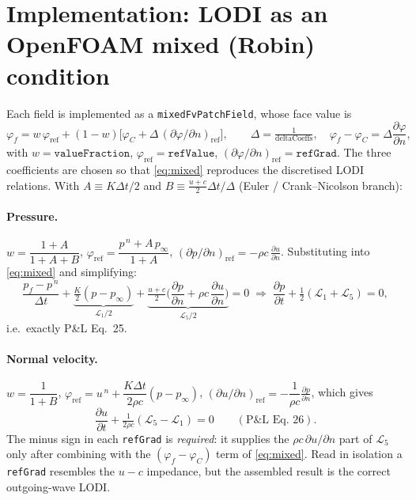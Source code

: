 \documentclass[11pt,a4paper]{article}
\newcommand{\dt}[1]{\frac{\partial #1}{\partial t}}
\newcommand{\dn}[1]{\frac{\partial #1}{\partial n}}
\newcommand{\Lc}{\mathcal{L}}
\newcommand{\code}[1]{\texttt{#1}}
\begin{document}
\section{Implementation: LODI as an OpenFOAM mixed (Robin) condition}
Each field is implemented as a \code{mixedFvPatchField}, whose face value is
\begin{equation}
  \varphi_f = w\,\varphi_{\mathrm{ref}}
              + (1-w)\big[\varphi_C + \Delta\,(\partial\varphi/\partial n)_{\mathrm{ref}}\big],
  \qquad \Delta=\tfrac{1}{\text{deltaCoeffs}},\quad
  \varphi_f-\varphi_C=\Delta\dn{\varphi},
  \label{eq:mixed}
\end{equation}
with $w=\code{valueFraction}$, $\varphi_{\mathrm{ref}}=\code{refValue}$,
$(\partial\varphi/\partial n)_{\mathrm{ref}}=\code{refGrad}$. The three
coefficients are chosen so that \eqref{eq:mixed} reproduces the discretised
LODI relations. With $A\equiv K\Delta t/2$ and
$B\equiv\tfrac{u+c}{2}\Delta t/\Delta$ (Euler / Crank--Nicolson branch):

\paragraph{Pressure.}
$w=\dfrac{1+A}{1+A+B}$,\;
$\varphi_{\mathrm{ref}}=\dfrac{p^{\,n}+A\,p_\infty}{1+A}$,\;
$(\partial p/\partial n)_{\mathrm{ref}}=-\rho c\,\dn{u}$. Substituting into
\eqref{eq:mixed} and simplifying:
\[
  \frac{p_f-p^{\,n}}{\Delta t}+\underbrace{\tfrac{K}{2}(p-p_\infty)}_{\Lc_1/2}
  +\underbrace{\tfrac{u+c}{2}\big(\dn{p}+\rho c\,\dn{u}\big)}_{\Lc_5/2}=0
  \;\Rightarrow\; \dt{p}+\tfrac12(\Lc_1+\Lc_5)=0,
\]
i.e.\ exactly P\&L Eq.~25.

\paragraph{Normal velocity.}
$w=\dfrac{1}{1+B}$,\;
$\varphi_{\mathrm{ref}}=u^{\,n}+\dfrac{K\Delta t}{2\rho c}(p-p_\infty)$,\;
$(\partial u/\partial n)_{\mathrm{ref}}=-\dfrac{1}{\rho c}\dn{p}$, which gives
\[
  \dt{u}+\tfrac{1}{2\rho c}(\Lc_5-\Lc_1)=0 \qquad(\text{P\&L Eq.~26}).
\]
The minus sign in each \code{refGrad} is \emph{required}: it supplies the
$\rho c\,\partial u/\partial n$ part of $\Lc_5$ only after combining with the
$(\varphi_f-\varphi_C)$ term of \eqref{eq:mixed}. Read in isolation a
\code{refGrad} resembles the $u-c$ impedance, but the assembled result is the
correct outgoing-wave LODI.
\end{document}
